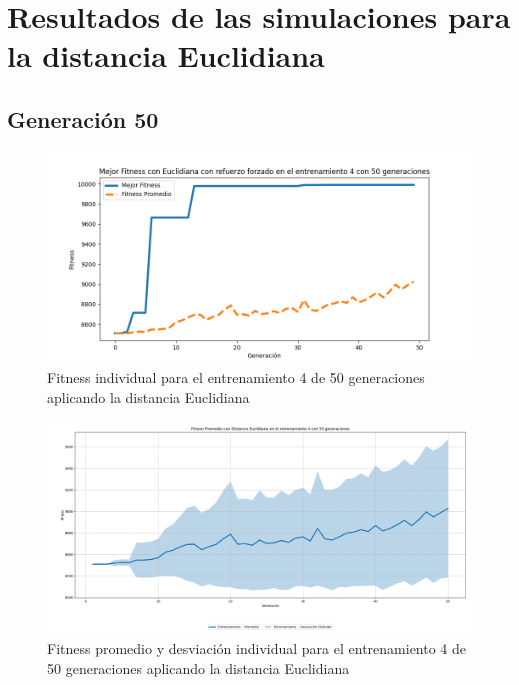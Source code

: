 \documentclass[conference]{IEEEtran}
\begin{document}
\section{Resultados de las simulaciones para la distancia Euclidiana}
\subsection{Generación 50}
\setcounter{figure}{0}
\renewcommand{\thefigure}{S\arabic{figure}A-E}

\begin{figure}[H]
    \centering
    \includegraphics[width=0.9\linewidth]{Euclidiana/Fitnes_individual/Fitness_4_Eucli_50Gen.png}
    \caption{Fitness individual para el entrenamiento 4 de 50 generaciones aplicando la distancia Euclidiana}
    \label{fig:Fitnes_ecu_4_50_inv}
\end{figure}
\begin{figure}[H]
    \centering
    \includegraphics[width=0.9\linewidth]{Euclidiana/Fitnes_individual/Fitness_4_Eucli_50Gen_Sombra.png}
    \caption{Fitness promedio y desviación individual para el entrenamiento 4 de 50 generaciones aplicando la distancia Euclidiana}
    \label{fig:Fitnes_ecu_4_50_inv_sombra}
\end{figure}

\end{document}

